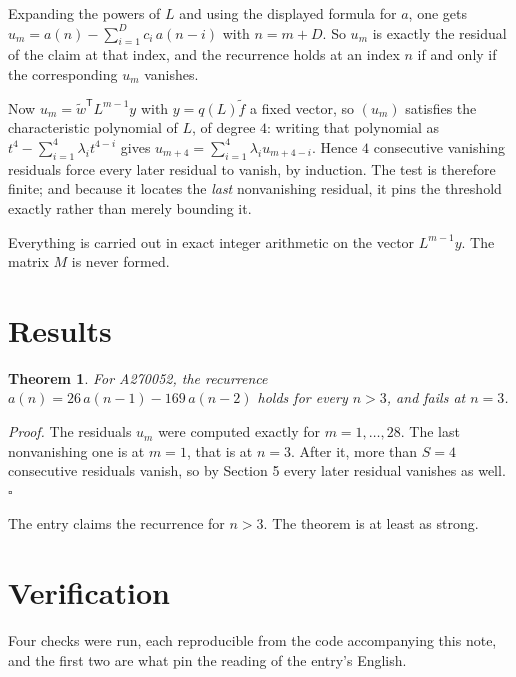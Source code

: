 \documentclass[11pt]{article}
\newtheorem{theorem}{Theorem}
\theoremstyle{definition}
\begin{document}
Expanding the powers of $L$ and using the displayed formula for $a$, one gets $u_m = a(n) - \sum_{i=1}^{D} c_i\,a(n-i)$ with $n = m + D$. So $u_m$ is exactly the residual of the claim at that index, and the recurrence holds at an index $n$ if and only if the corresponding $u_m$ vanishes.

Now $u_m = \tilde w^{\mathsf T} L^{m-1} y$ with $y = q(L)\tilde f$ a fixed vector, so $(u_m)$ satisfies the characteristic polynomial of $L$, of degree $4$: writing that polynomial as $t^{4} - \sum_{i=1}^{4} \lambda_i t^{4-i}$ gives $u_{m+4} = \sum_{i=1}^{4} \lambda_i u_{m+4-i}$. Hence $4$ consecutive vanishing residuals force every later residual to vanish, by induction. The test is therefore finite; and because it locates the {\itshape last} nonvanishing residual, it pins the threshold exactly rather than merely bounding it.

Everything is carried out in exact integer arithmetic on the vector $L^{m-1}y$. The matrix $M$ is never formed.

\section{Results}

\begin{theorem} For A270052, the recurrence $a(n) = 26\,a(n-1) - 169\,a(n-2)$ holds for every $n > 3$, and fails at $n = 3$.\end{theorem}

{\itshape Proof.} The residuals $u_m$ were computed exactly for $m = 1,\dots,28$. The last nonvanishing one is at $m = 1$, that is at $n = 3$. After it, more than $S = 4$ consecutive residuals vanish, so by Section 5 every later residual vanishes as well. $\square$

The entry claims the recurrence for $n > 3$. The theorem is at least as strong.

\section{Verification}

Four checks were run, each reproducible from the code accompanying this note, and the first two are what pin the reading of the entry's English.
\end{document}
